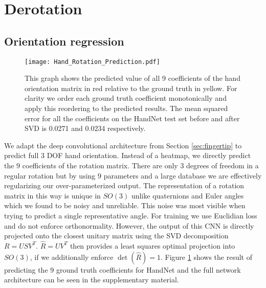 \documentclass{bmvc2k}
\begin{document}

\section{Derotation}\label{sec:derotation}

\subsection{Orientation regression}\label{sec:regression}

\begin{figure}[t]
\begin{center}
\texttt{[image: Hand\_Rotation\_Prediction.pdf]}
\end{center}
   \caption{\scriptsize \color{blue} This graph shows the predicted value of all 9 coefficients of the hand orientation matrix in red relative to the ground truth in yellow. For clarity we order each ground truth coefficient monotonically and apply this reordering to the predicted results. The mean squared error for all the coefficients on the HandNet test set before and after SVD is 0.0271 and 0.0234 respectively.}
\label{fig:rotationgraph}
\end{figure}

We adapt the deep convolutional architecture from Section \ref{sec:fingertip} to predict full $3$ DOF hand orientation. Instead of a heatmap, we directly predict the $9$ coefficients of the rotation matrix. There are only $3$ degrees of freedom in a regular rotation but by using $9$ parameters and a large database we are effectively regularizing our over-parameterized output. The representation of a rotation matrix in this way is unique in $SO\left(3\right)$ unlike quaternions and Euler angles which we found to be noisy and unreliable. This noise was most visible when trying to predict a single representative angle. For training we use Euclidian loss and do not enforce orthonormality. However, the output of this CNN is directly projected onto the closest unitary matrix using the SVD decomposition $R = USV^T$. $\hat{R} = UV^T$ then provides a least squares optimal projection into $SO\left(3\right)$, if we additionally enforce $\det\left(\hat{R}\right)=1$. Figure \ref{fig:rotationgraph} shows the result of predicting the $9$ ground truth coefficients for HandNet and the full network architecture can be seen in the supplementary material. 
\end{document}
